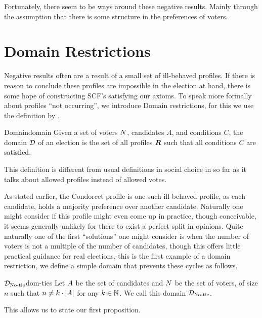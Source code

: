 Fortunately, there seem to be ways around these negative results. Mainly
through the assumption that there is some structure in the preferences of
voters.

\section{Domain Restrictions} \label{sec:Domain-res}

Negative results often are a result of a small set of ill-behaved profiles. If there is
reason to conclude these profiles are impossible in the election at hand, there
is some hope of constructing SCF's satisfying our axioms. To speak more
formally about profiles ``not occurring'', we introduce Domain restrictions, for
this we use the definition by
\citet{elkindPreferenceRestrictionsComputational2022}.

\begin{definition}{Domain}{domain}
	{
		Given a set of voters $N$, candidates $A$, and conditions $C$, the domain $\mathcal{D}_{\textnormal{}}$ of an election is the set of all profiles $\boldsymbol{R}$ such that all conditions $C$ are satisfied.
	}
\end{definition}

This definition is different from usual definitions in social choice in so far as it talks about allowed profiles instead of allowed votes.

As stated earlier, the Condorcet profile is one such ill-behaved profile, as
each candidate, holds a majority preference over another candidate. Naturally
one might consider if this profile might even come up in practice, though
conceivable, it seems generally unlikely for there to exist a perfect split in
opinions. Quite naturally one of the first ``solutions'' one might consider is
when the number of voters is not a multiple of the number of candidates, though
this offers little practical guidance for real elections, this is the first
example of a domain restriction, we define a simple domain that prevents these
cycles as follows.

\begin{definition}{$\mathcal{D}_{\textnormal{No-tie}}$}{dom-ties}
	Let $A$ be the set of candidates and $N$ be the set of voters, of size $n$ such that $n \neq k \cdot |A|$ for any $k \in \mathbb{N}$. We call this domain $\mathcal{D}_{\textnormal{No-tie}}$.
\end{definition}

This allows us to state our first proposition.

